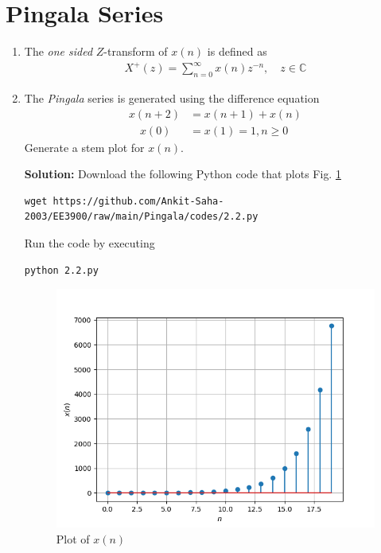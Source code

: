 \documentclass[journal,12pt,twocolumn]{IEEEtran}
\newcommand{\solution}{\noindent \textbf{Solution: }}
\providecommand{\brak}[1]{\ensuremath{\left(#1\right)}}
\numberwithin{equation}{section}
\renewcommand\thesection{\arabic{section}}
\begin{document}
\section{Pingala Series}
\begin{enumerate}[label=\thesection.\arabic*,ref=\thesection.\theenumi]
\item The {\em one sided} $Z$-transform of $x(n)$ is defined as 
\begin{align}
	X^{+}(z) = \sum_{n = 0}^{\infty}x(n)z^{-n}, \quad z \in \mathbb{C}
\label{eq:one-Z}
\end{align}
	\item The {\em Pingala} series is generated using the difference equation 
\begin{align}
	x(n+2) &= x\brak{n+1} + x\brak{n} \\  \quad x(0) &= x(1) = 1, n \ge 0
	\label{eq:10-pingala}
\end{align}
Generate a stem plot for $x(n)$.

\solution
Download the following Python code that plots Fig. \ref{fig-1}
\begin{lstlisting}
wget https://github.com/Ankit-Saha-2003/EE3900/raw/main/Pingala/codes/2.2.py
\end{lstlisting}

Run the code by executing
\begin{lstlisting}
python 2.2.py
\end{lstlisting}

\begin{figure}[!htp]
    \includegraphics[width=\columnwidth]{figs/fig-1.png}
    \caption{Plot of $x(n)$}
    \label{fig-1}
\end{figure}



\end{enumerate}
\end{document}

